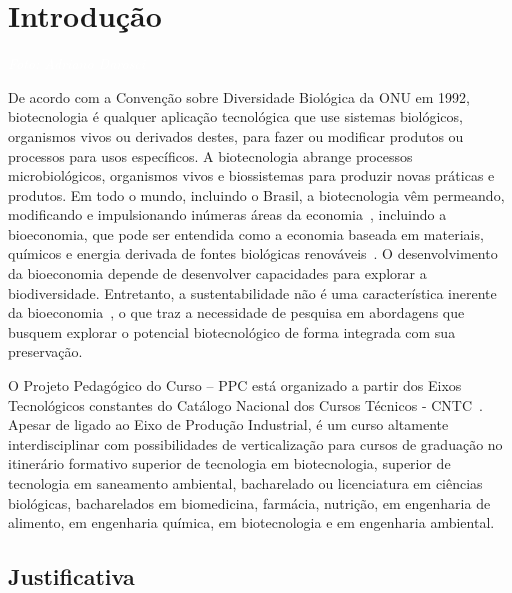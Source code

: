 \documentclass[11pt,fleqn]{book} %
\begin{document}

\chapter{Introdução}
\vspace{6em}
\begin{flushright}
	\textit{\textcolor{white}{Foto: Adriano Darosci}}
\end{flushright}
\vspace{12em}
\indent

De acordo com a Convenção sobre Diversidade Biológica da ONU em 1992, biotecnologia é qualquer aplicação tecnológica que use sistemas biológicos, organismos vivos ou derivados destes, para fazer ou modificar produtos ou processos para usos específicos.
A biotecnologia abrange processos microbiológicos, organismos vivos e biossistemas para produzir novas práticas e produtos.
Em todo o mundo, incluindo o Brasil, a biotecnologia vêm permeando, modificando e impulsionando inúmeras áreas da economia~\cite{dias2017bioeconomiabrasil}, incluindo a bioeconomia, que pode ser entendida como a economia baseada em materiais, químicos e energia derivada de fontes biológicas renováveis~\cite{mccormick2013bioeconomy}.
O desenvolvimento da bioeconomia depende de desenvolver capacidades para explorar a biodiversidade. 
Entretanto, a sustentabilidade não é uma característica inerente da bioeconomia~\cite{pfau2014visions}, o que traz a necessidade de pesquisa em abordagens que busquem explorar o potencial biotecnológico de forma integrada com sua preservação.

O Projeto Pedagógico do Curso – PPC está organizado a partir dos Eixos Tecnológicos constantes do Catálogo Nacional dos Cursos Técnicos - CNTC~\cite{CatalogoCursosTecnicos2016}.
Apesar de ligado ao Eixo de Produção Industrial, é um curso altamente interdisciplinar com possibilidades de verticalização para cursos de graduação no itinerário formativo superior de tecnologia em biotecnologia, superior de tecnologia em saneamento ambiental, bacharelado ou licenciatura em ciências biológicas, bacharelados em biomedicina, farmácia, nutrição, em engenharia de alimento, em engenharia química, em biotecnologia e em engenharia ambiental.

\section{Justificativa}
\indent
\end{document}
